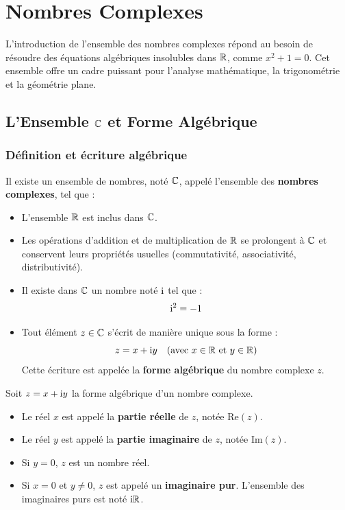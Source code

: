 \chapter{Nombres Complexes}

L'introduction de l'ensemble des nombres complexes répond au besoin de résoudre des équations algébriques insolubles dans $\mathbb{R}$, comme $x^2 + 1 = 0$. Cet ensemble offre un cadre puissant pour l'analyse mathématique, la trigonométrie et la géométrie plane.

\section{L'Ensemble $\mathbb{C}$ et Forme Algébrique}

\subsection{Définition et écriture algébrique}

\begin{theoreme}
Il existe un ensemble de nombres, noté $\mathbb{C}$, appelé l'ensemble des \textbf{nombres complexes}, tel que :
\begin{itemize}
    \item L'ensemble $\mathbb{R}$ est inclus dans $\mathbb{C}$.
    \item Les opérations d'addition et de multiplication de $\mathbb{R}$ se prolongent à $\mathbb{C}$ et conservent leurs propriétés usuelles (commutativité, associativité, distributivité).
    \item Il existe dans $\mathbb{C}$ un nombre noté $\mathrm{i}$ tel que :
    \[
    \mathrm{i}^2 = -1
    \]
    \item Tout élément $z \in \mathbb{C}$ s'écrit de manière unique sous la forme :
    \[
    z = x + \mathrm{i} y \quad (\text{avec } x \in \mathbb{R} \text{ et } y \in \mathbb{R})
    \]
    Cette écriture est appelée la \textbf{forme algébrique} du nombre complexe $z$.
\end{itemize}
\end{theoreme}

\begin{definition}[Vocabulaire]
Soit $z = x + \mathrm{i} y$ la forme algébrique d'un nombre complexe.
\begin{itemize}
    \item Le réel $x$ est appelé la \textbf{partie réelle} de $z$, notée $\mathrm{Re}(z)$.
    \item Le réel $y$ est appelé la \textbf{partie imaginaire} de $z$, notée $\mathrm{Im}(z)$.
    \item Si $y = 0$, $z$ est un nombre réel.
    \item Si $x = 0$ et $y \ne 0$, $z$ est appelé un \textbf{imaginaire pur}. L'ensemble des imaginaires purs est noté $\mathrm{i}\mathbb{R}$.
\end{itemize}
\end{definition}

